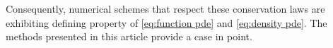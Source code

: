 \documentclass[final,leqno]{siamltex1213}
\begin{document}
Consequently, numerical schemes that respect these conservation laws are exhibiting defining property of \eqref{eq:function pde} and \eqref{eq:density pde}.
The methods presented in this article provide a case in point.%
\end{document}
